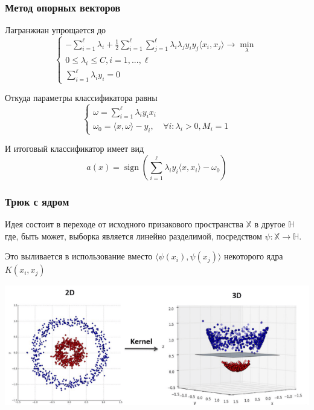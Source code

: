 \documentclass{beamer}
\DeclareMathOperator{\sign}{sign}
\begin{document}
	\begin{frame}
		\frametitle{Метод опорных векторов}
		Лагранжиан упрощается до
		\[
		\begin{cases}
			- \sum_{i=1}^{\ell} \lambda_i + 
			\frac{1}{2} \sum_{i=1}^{\ell} \sum_{j=1}^{\ell}
			\lambda_i \lambda_j y_i y_j \langle x_i, x_j \rangle
			\rightarrow \min_{\lambda} \\
			
			0 \le \lambda_i \le C, i=1, ..., \ell \\
			
			\sum_{i=1}^{\ell} \lambda_i y_i = 0
		\end{cases}
		\]
		
		 Откуда параметры классификатора равны
		\[
		\begin{cases}
			\omega = \sum_{i=1}^{\ell} \lambda_i y_i x_i \\
			\omega_0 = \langle x, \omega \rangle - y_i, & \forall i: \lambda_i > 0, M_i = 1
		\end{cases}
		\]
		
		И итоговый классификатор имеет вид
		\[
		a(x) = \sign \left( \sum_{i=1}^{\ell} \lambda_i y_i \langle x, x_i \rangle - \omega_0 \right)
		\]
	\end{frame}
	
	\begin{frame}
		\frametitle{Трюк с ядром}
		Идея состоит в переходе от исходного призакового пространства $\mathbb{X}$ в другое $\mathbb{H}$ где, быть может, выборка является линейно разделимой, посредством $\psi: \mathbb{X} \rightarrow \mathbb{H}$. 
		
		Это выливается в использование вместо $\langle \psi (x_i), \psi (x_j) \rangle$ некоторого ядра $K(x_i, x_j)$
		
		\includegraphics[width=1\textwidth]{img/kernel_trick.png}
	\end{frame}
	
\end{document}
